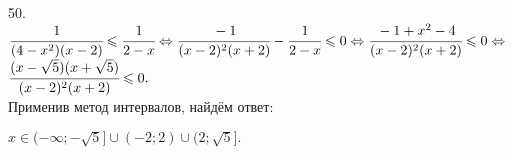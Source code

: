 50. $\cfrac{1}{(4-x^2)(x-2)}\leqslant\cfrac{1}{2-x} \Leftrightarrow\cfrac{-1}{(x-2)^2(x+2)}-\cfrac{1}{2-x}\leqslant0\Leftrightarrow
\cfrac{-1+x^2-4}{(x-2)^2(x+2)}\leqslant0\Leftrightarrow$\\$\cfrac{(x-\sqrt{5})(x+\sqrt{5})}{(x-2)^2(x+2)}\leqslant0.$\\ Применив метод интервалов, найдём ответ:
\begin{figure}[ht!]
\end{figure}
$x\in(-\infty;-\sqrt{5}]\cup(-2;2)\cup(2;\sqrt{5}].$\\
